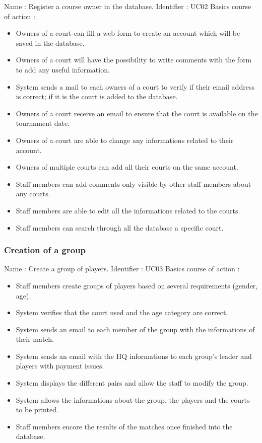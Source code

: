 Name : Register a course owner in the database. \newline
Identifier : UC02 \newline
Basics course of action : \newline
\begin{itemize}
	\item Owners of a court can fill a web form to create an account which will be saved in the database.
	\item Owners of a court will have the possibility to write comments with the form to add any useful information.
	\item System sends a mail to each owners of a court to verify if their email address is correct; if it is the court is added to the database.
	\item Owners of a court receive an email to ensure that the court is available on the tournament date.
	\item Owners of a court are able to change any informations related to their account.
	\item Owners of multiple courts can add all their courts on the same account.
	\item Staff members can add comments only visible by other staff members about any courts.
	\item Staff members are able to edit all the informations related to the courts.
	\item Staff members can search through all the database a specific court.
\end{itemize}


\subsubsection{Creation of a group}

Name : Create a group of players. \newline
Identifier : UC03 \newline
Basics course of action : \newline
\begin{itemize}
	\item Staff members create groups of players based on several requirements (gender, age).
	\item System verifies that the court used and the age category are correct.
	\item System sends an email to each member of the group with the informations of their match.
	\item System sends an email with the HQ informations to each group's leader and players with payment issues.
	\item System displays the different pairs and allow the staff to modify the group.
	\item System allows the informations about the group, the players and the courts to be printed.
	\item Staff members encore the results of the matches once finished into the database.
\end{itemize}
